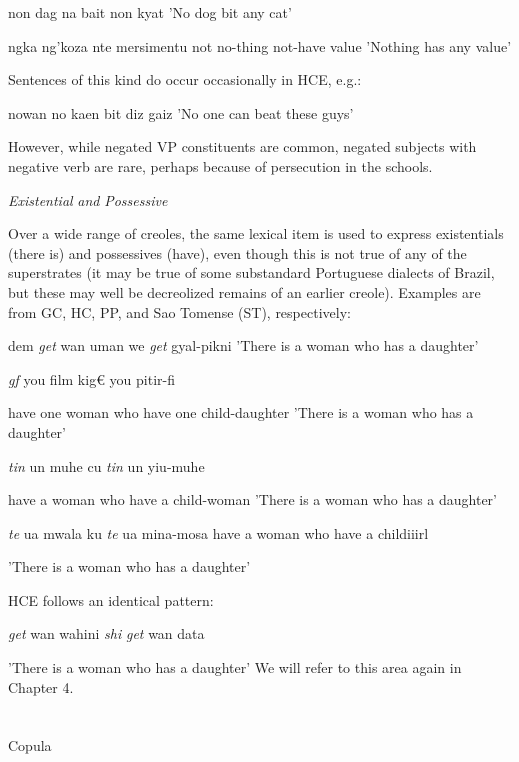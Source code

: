 \ea\label{ex:52}
 non dag na bait non kyat 'No dog bit any cat'
\glt
\z

\ea\label{ex:53}
 ngka ng'koza nte mersimentu not no-thing not-have value 'Nothing has any value'
\glt
\z

Sentences of this kind do occur occasionally in HCE, e.g.:

\ea\label{ex:54}
 nowan no kaen bit diz gaiz 'No one can beat these guys'
\glt
\z

However, while negated VP constituents are common, negated subjects with negative verb are rare, perhaps because of persecution in the schools.

\textit{Existential} \textit{and} \textit{Possessive}

Over a wide range of creoles, the same lexical item is used to express existentials ({\textquotedbl}there is{\textquotedbl}) and possessives ({\textquotedbl}have{\textquotedbl}), even though this is not true of any of the superstrates (it may be true of some substandard Portuguese dialects of Brazil, but these may well be de\-creolized remains of an earlier creole). Examples are from GC, HC, PP, and Sao Tomense (ST), respectively:

\ea\label{ex:55}
 dem \textit{get} wan uman we \textit{get }gyal-pikni 'There is a woman who has a daughter'
\glt
\z

\ea\label{ex:56}
\textit{gf} you film kig€ you pitir-fi
\glt
\z

have one woman who have one child-daughter 'There is a woman who has a daughter'

\ea\label{ex:57}
 \textit{tin} un muhe cu \textit{tin} un yiu-muhe
\glt
\z

have a woman who have a child-woman 'There is a woman who has a daughter'

\ea\label{ex:58}
 \textit{te} ua mwala ku \textit{te} ua mina-mosa have a woman who have a childiiirl
\glt
\z

'There is a woman who has a daughter'


HCE follows an identical pattern:

\ea\label{ex:59}
 \textit{get} wan wahini \textit{shi} \textit{get} wan data
\glt
\z

'There is a woman who has a daughter' We will refer to this area again in Chapter 4.

\section{}
Copula

